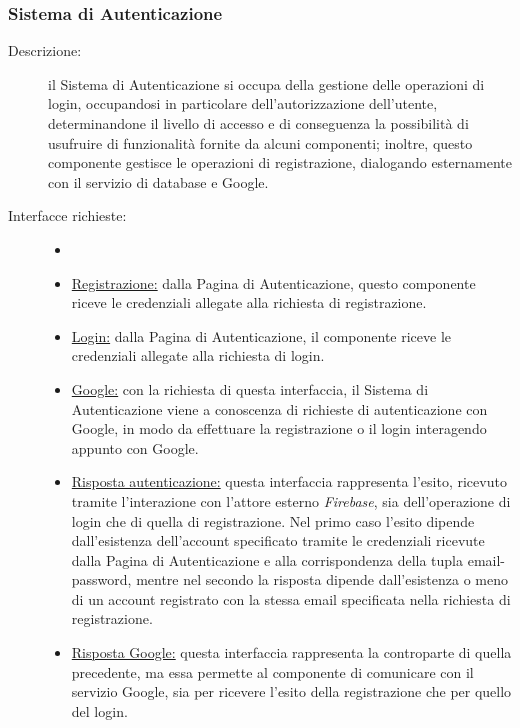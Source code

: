\documentclass[11pt, a4paper]{article}
\theoremstyle{definition} %
\begin{document}
\subsubsection{Sistema di Autenticazione}
\begin{description}
    \item[Descrizione:] il Sistema di Autenticazione si occupa della
    gestione delle operazioni di login, occupandosi in particolare
    dell'autorizzazione dell'utente, determinandone il livello di
    accesso e di conseguenza la possibilità di usufruire di funzionalità
    fornite da alcuni componenti; inoltre, questo componente gestisce
    le operazioni di registrazione, dialogando esternamente con il
    servizio di database e Google.

    \item[Interfacce richieste:]
    \begin{itemize}
        \item[]

        \item \underline{Registrazione:} dalla Pagina di Autenticazione,
        questo componente riceve le credenziali allegate alla richiesta
        di registrazione.

        \item \underline{Login:} dalla Pagina di Autenticazione, il
        componente riceve le credenziali allegate alla richiesta di
        login.

        \item \underline{Google:} con la richiesta di questa interfaccia,
        il Sistema di Autenticazione viene a conoscenza di richieste di
        autenticazione con Google, in modo da effettuare la registrazione
        o il login interagendo appunto con Google.

        \item \underline{Risposta autenticazione:} questa interfaccia
        rappresenta l'esito, ricevuto tramite l'interazione con
        l'attore esterno \textit{Firebase}, sia dell'operazione di
        login che di quella di registrazione. Nel primo caso l'esito
        dipende dall'esistenza dell'account specificato tramite le
        credenziali ricevute dalla Pagina di Autenticazione e alla
        corrispondenza della tupla email-password, mentre
        nel secondo la risposta dipende dall'esistenza o meno di
        un account registrato con la stessa email specificata nella
        richiesta di registrazione.

        \item \underline{Risposta Google:} questa interfaccia rappresenta
        la controparte di quella precedente, ma essa permette al componente
        di comunicare con il servizio Google, sia per ricevere l'esito
        della registrazione che per quello del login.
    \end{itemize}


\end{description}
\end{document}
